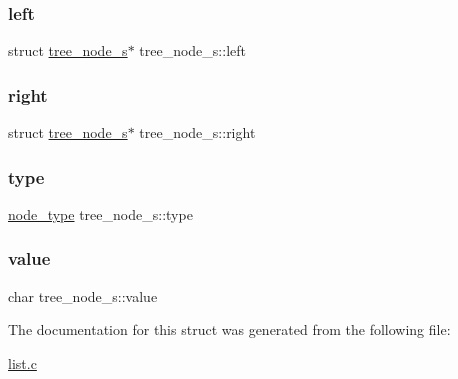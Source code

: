 \mbox{\label{structtree__node__s_a06f95eb6b6b6d8b13c83d797532ecc2f}} 
\subsubsection{\texorpdfstring{left}{left}}
{\footnotesize\ttfamily struct \mbox{\hyperlink{structtree__node__s}{tree\+\_\+node\+\_\+s}}$\ast$ tree\+\_\+node\+\_\+s\+::left}

\mbox{\label{structtree__node__s_abed0324b1cb4a573e75d7bc58c555332}} 
\subsubsection{\texorpdfstring{right}{right}}
{\footnotesize\ttfamily struct \mbox{\hyperlink{structtree__node__s}{tree\+\_\+node\+\_\+s}}$\ast$ tree\+\_\+node\+\_\+s\+::right}

\mbox{\label{structtree__node__s_a090b69b8f438d25df237e4b217eac3e5}} 
\subsubsection{\texorpdfstring{type}{type}}
{\footnotesize\ttfamily \mbox{\hyperlink{list_8h_a6a276b85e2da28c5f9c3dbce61c55682}{node\+\_\+type}} tree\+\_\+node\+\_\+s\+::type}

\mbox{\label{structtree__node__s_a3f82a6355d2a50f51dcafd8217aa8e20}} 
\subsubsection{\texorpdfstring{value}{value}}
{\footnotesize\ttfamily char tree\+\_\+node\+\_\+s\+::value}



The documentation for this struct was generated from the following file\+:\begin{DoxyCompactItemize}
\item 
\mbox{\hyperlink{list_8c}{list.\+c}}\end{DoxyCompactItemize}
